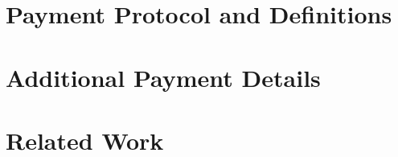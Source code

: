 \documentclass{article}
\begin{document}
    \section{Payment Protocol and Definitions}
    \label{paymentsprotocol}
    
    
    \section{Additional Payment Details}
    \label{paymentsextra}
    
    
    \section{Related Work}
    \label{sec:related}
    
\end{document}
